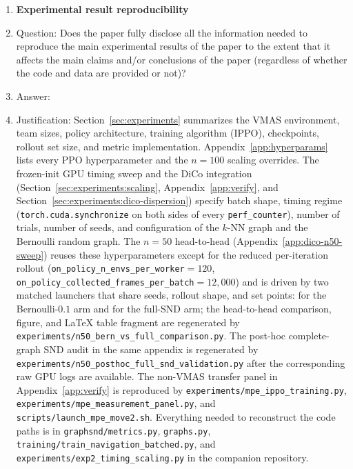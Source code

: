 \begin{enumerate}
\item {\bf Experimental result reproducibility}
    \item[] Question: Does the paper fully disclose all the information needed to reproduce the main experimental results of the paper to the extent that it affects the main claims and/or conclusions of the paper (regardless of whether the code and data are provided or not)?
    \item[] Answer: \answerYes{}
    \item[] Justification: Section~\ref{sec:experiments}
    summarizes the VMAS environment, team sizes, policy architecture,
    training algorithm (IPPO), checkpoints, rollout
    set size, and metric implementation. Appendix~\ref{app:hyperparams}
    lists every PPO hyperparameter and the $n{=}100$ scaling overrides.
    The frozen-init GPU timing sweep and the DiCo integration
    (Section~\ref{sec:experiments:scaling},
    Appendix~\ref{app:verify}, and Section~\ref{sec:experiments:dico-dispersion})
    specify batch
    shape, timing regime (\texttt{torch.cuda.synchronize} on both
    sides of every \texttt{perf\_counter}), number of trials, number
    of seeds, and configuration of the $k$-NN graph and the Bernoulli
    random graph. The $n{=}50$ head-to-head
    (Appendix~\ref{app:dico-n50-sweep}) reuses these hyperparameters
    except for the reduced per-iteration rollout
    (\texttt{on\_policy\_n\_envs\_per\_worker}${=}120$,
    \texttt{on\_policy\_collected\_frames\_per\_batch}${=}12{,}000$)
    and is driven by two matched launchers that share seeds, rollout
    shape, and set points:
    for the Bernoulli-$0.1$ arm and
    for the full-SND arm; the head-to-head comparison, figure, and
    LaTeX table fragment are regenerated by
    \texttt{experiments/n50\_bern\_vs\_full\_comparison.py}. The
    post-hoc complete-graph SND audit in the same appendix is
    regenerated by
    \texttt{experiments/n50\_posthoc\_full\_snd\_validation.py}
    after the corresponding raw GPU logs are available. The
    non-VMAS transfer panel in Appendix~\ref{app:verify} is reproduced by
    \texttt{experiments/mpe\_ippo\_training.py},
    \texttt{experiments/mpe\_measurement\_panel.py}, and
    \texttt{scripts/launch\_mpe\_move2.sh}.
    Everything needed to reconstruct the code paths is
    in \texttt{graphsnd/metrics.py}, \texttt{graphs.py},
    \texttt{training/train\_navigation\_batched.py}, and
    \texttt{experiments/exp2\_timing\_scaling.py} in the companion
    repository.


\end{enumerate}
